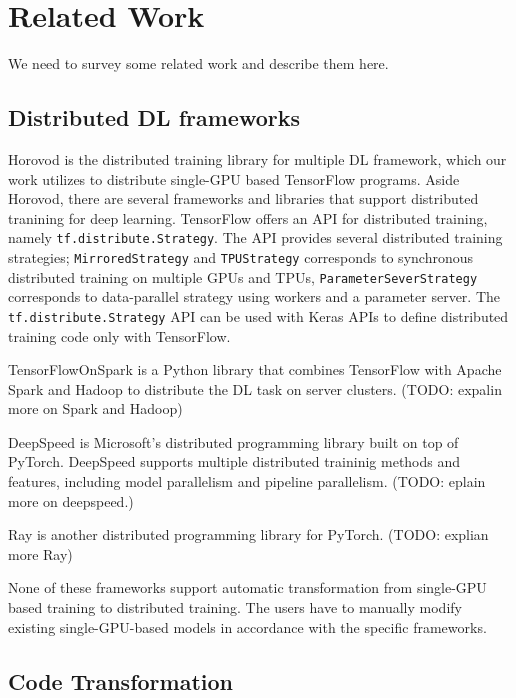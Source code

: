 \section{Related Work}\label{sec:related}
We need to survey some related work and describe them here.

\subsection{Distributed DL frameworks}

Horovod is the distributed training library for multiple
DL framework, which our work utilizes to distribute single-GPU
based TensorFlow programs.
Aside Horovod, there are several frameworks and libraries that support
distributed tranining for deep learning.
TensorFlow offers an API for distributed training,
namely {\tt tf.distribute.Strategy}. 
The API provides several distributed training strategies;
{\tt MirroredStrategy} and {\tt TPUStrategy} corresponds to 
synchronous distributed training on multiple GPUs and TPUs,  
{\tt ParameterSeverStrategy} corresponds to 
data-parallel strategy using workers and a parameter server.
The {\tt tf.distribute.Strategy} API can be used with Keras APIs
to define distributed training code only with TensorFlow.  

TensorFlowOnSpark\cite{tfonspark} is a Python library that
combines TensorFlow with Apache Spark and Hadoop to distribute
the DL task on server clusters. 
(TODO: expalin more on Spark and Hadoop)

DeepSpeed\cite{deepspeed} is Microsoft's distributed programming library
built on top of PyTorch\cite{pytorch2019}.  
DeepSpeed supports multiple distributed traininig methods and features,
including model parallelism and pipeline parallelism. 
(TODO: eplain more on deepspeed.)

Ray\cite{???} is another distributed programming library for PyTorch. 
(TODO: explian more Ray)

None of these frameworks support automatic transformation from single-GPU
based training to distributed training. 
The users have to manually modify existing single-GPU-based models
in accordance with the specific frameworks. 


\subsection{Code Transformation}

